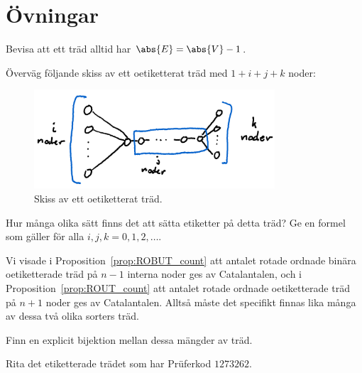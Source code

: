 \documentclass[nobib]{tufte-handout}
\begin{document}
\section{Övningar}

\begin{xca}
    Bevisa att ett träd alltid har $\abs{E} = \abs{V} - 1$.
\end{xca}

\begin{xca}
    Överväg följande skiss av ett oetiketterat träd med $1 + i + j + k$ noder:
    \begin{figure}
        \centering
        \includegraphics[width=0.8\textwidth]{graphics/exercise_label_unlabelled_tree.png}
        \caption{Skiss av ett oetiketterat träd.}
    \end{figure}

    Hur många olika sätt finns det att sätta etiketter på detta träd? Ge en formel som gäller för alla $i, j, k = 0, 1, 2,\ldots$.
\end{xca}

\begin{xca}
    Vi visade i Proposition~\ref{prop:ROBUT_count} att antalet rotade ordnade binära oetiketterade träd på $n-1$ interna noder ges av Catalantalen, och i Proposition~\ref{prop:ROUT_count} att antalet rotade ordnade oetiketterade träd på $n+1$ noder ges av Catalantalen. Alltså måste det specifikt finnas lika många av dessa två olika sorters träd.

    Finn en explicit bijektion mellan dessa mängder av träd.
\end{xca}

\begin{xca}
    Rita det etiketterade trädet som har Prüferkod $1273262$.
\end{xca}
\end{document}
